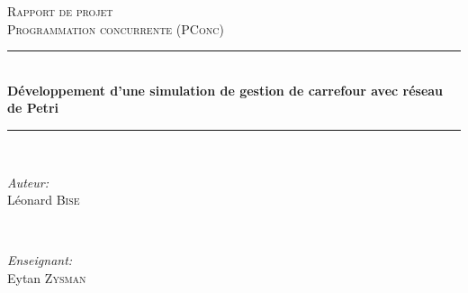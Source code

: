 \begin{titlepage}

\newcommand{\HRule}{\rule{\linewidth}{0.5mm}} %

\center %
 


\vspace{3cm}

\textsc{\Large Rapport de projet}\\[0.5cm] %
\textsc{\large Programmation concurrente (PConc)}\\[0.5cm] %


\HRule \\[0.4cm]
{ \huge \bfseries Développement d'une simulation de gestion de carrefour avec réseau de Petri}\\[0.4cm] %
\HRule \\[1.5cm]
 

\begin{minipage}{0.4\textwidth}
\begin{flushleft} \large
\emph{Auteur:}\\
Léonard \textsc{Bise} %
\end{flushleft}
\end{minipage}
~
\begin{minipage}{0.4\textwidth}
\begin{flushright} \large
\emph{Enseignant:} \\
Eytan \textsc{Zysman} %
\end{flushright}
\end{minipage}\\[2cm]


\end{titlepage}
